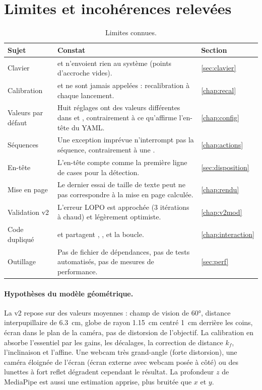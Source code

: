 \section{Limites et incohérences relevées}

\begin{table}[H]
\centering\small
\begin{tabularx}{\textwidth}{@{}l L l@{}}
\toprule
Sujet & Constat & Section \\
\midrule
Clavier &  et  n'envoient rien au système (points d'accroche vides). & \ref{sec:clavier} \\
Calibration &  et  ne sont jamais appelées : recalibration à chaque lancement. & \ref{chap:recal} \\
Valeurs par défaut & Huit réglages ont des valeurs différentes dans  et , contrairement à ce qu'affirme l'en-tête du YAML. & \ref{chap:config} \\
Séquences & Une exception imprévue n'interrompt pas la séquence, contrairement à une . & \ref{chap:actions} \\
En-tête & L'en-tête compte comme la première ligne de cases pour la détection. & \ref{sec:disposition} \\
Mise en page & Le dernier essai de taille de texte peut ne pas correspondre à la mise en page calculée. & \ref{chap:rendu} \\
Validation v2 & L'erreur LOPO est approchée (3 itérations à chaud) et légèrement optimiste. & \ref{chap:v2mod} \\
Code dupliqué &  et  partagent , ,  et la boucle. & \ref{chap:interaction} \\
Outillage & Pas de fichier de dépendances, pas de tests automatisés, pas de mesures de performance. & \ref{sec:perf} \\
\bottomrule
\end{tabularx}
\caption{Limites connues.}
\end{table}

\paragraph{Hypothèses du modèle géométrique.} La v2 repose sur des valeurs moyennes : champ de vision de \ang{60}, distance interpupillaire de \qty{6.3}{\centi\metre}, globe de rayon \qty{1.15}{\centi\metre} centré \qty{1}{\centi\metre} derrière les coins, écran dans le plan de la caméra, pas de distorsion de l'objectif. La calibration en absorbe l'essentiel par les gains, les décalages, la correction de distance $k_f$, l'inclinaison et l'affine. Une webcam très grand-angle (forte distorsion), une caméra éloignée de l'écran (écran externe avec webcam posée à côté) ou des lunettes à fort reflet dégradent cependant le résultat. La profondeur $z$ de MediaPipe est aussi une estimation apprise, plus bruitée que $x$ et $y$.

